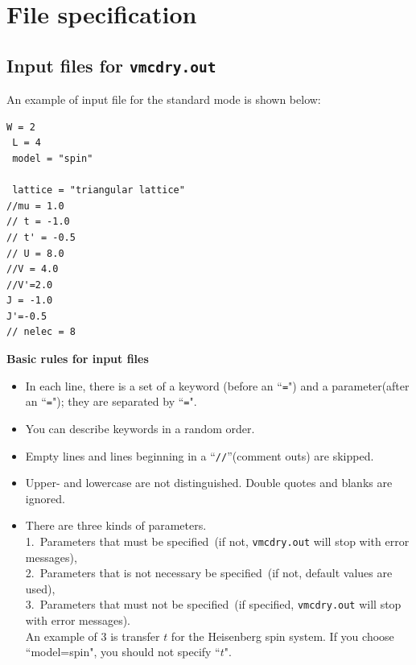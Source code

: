 \chapter{File specification}

\section{Input files for \texttt{vmcdry.out}}
\label{Ch:HowToStandard}

An example of input file for the standard mode is shown below:

\begin{minipage}{10cm}
\begin{screen}
\begin{verbatim}
W = 2
 L = 4
 model = "spin"

 lattice = "triangular lattice"
//mu = 1.0
// t = -1.0
// t' = -0.5
// U = 8.0
//V = 4.0
//V'=2.0
J = -1.0
J'=-0.5
// nelec = 8
\end{verbatim}
\end{screen}
\end{minipage}

{\bf Basic rules for input files}
\begin{itemize}
\item In each line, there is a set of a keyword (before an ``\verb|=|") and a parameter(after an ``\verb|=|"); 
  they are separated by ``\verb|=|".
\item You can describe keywords in a random order.
\item Empty lines and lines beginning in a ``\verb|//|''(comment outs) are skipped.
\item Upper- and lowercase are not distinguished.
  Double quotes and blanks are ignored.
\item There are three kinds of parameters.\\ 
  1.~Parameters that must be specified~(if not, \verb|vmcdry.out| will stop with error messages),\\ 
  2.~Parameters that is not necessary be specified~(if not, default values are used),\\
  3.~Parameters that must not be specified~(if specified, \verb|vmcdry.out| will stop with error messages).\\
  An example of 3 is transfer $t$ for the Heisenberg spin system. 
  If you choose ``model=spin", you should not specify ``$t$".
\end{itemize}

